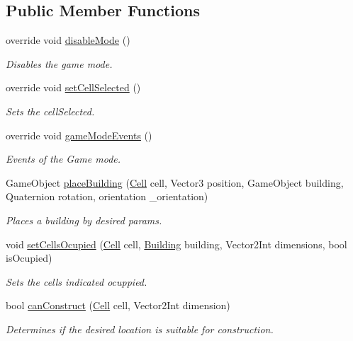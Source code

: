 \subsection*{Public Member Functions}
\begin{DoxyCompactItemize}
\item 
override void \mbox{\hyperlink{class_construction_mode_a4229d5bd9df34fd90758404acd3b9cc8}{disable\+Mode}} ()
\begin{DoxyCompactList}\small\item\em Disables the game mode. \end{DoxyCompactList}\item 
override void \mbox{\hyperlink{class_construction_mode_a4668815afe087d0cea35f8c7144e47f9}{set\+Cell\+Selected}} ()
\begin{DoxyCompactList}\small\item\em Sets the cell\+Selected. \end{DoxyCompactList}\item 
override void \mbox{\hyperlink{class_construction_mode_a58599c3aac705627c3b0fd034d54092a}{game\+Mode\+Events}} ()
\begin{DoxyCompactList}\small\item\em Events of the Game mode. \end{DoxyCompactList}\item 
Game\+Object \mbox{\hyperlink{class_construction_mode_abc41d867b12bfe26c28bea8ce773614d}{place\+Building}} (\mbox{\hyperlink{class_cell}{Cell}} cell, Vector3 position, Game\+Object building, Quaternion rotation, orientation \+\_\+orientation)
\begin{DoxyCompactList}\small\item\em Places a building by desired params. \end{DoxyCompactList}\item 
void \mbox{\hyperlink{class_construction_mode_acb76129315318237f90ea4dd25fb57b9}{set\+Cells\+Ocupied}} (\mbox{\hyperlink{class_cell}{Cell}} cell, \mbox{\hyperlink{class_building}{Building}} building, Vector2\+Int dimensions, bool is\+Ocupied)
\begin{DoxyCompactList}\small\item\em Sets the cells indicated ocuppied. \end{DoxyCompactList}\item 
bool \mbox{\hyperlink{class_construction_mode_aaf154f26d7cca5d1b8fd7a4d246616c6}{can\+Construct}} (\mbox{\hyperlink{class_cell}{Cell}} cell, Vector2\+Int dimension)
\begin{DoxyCompactList}\small\item\em Determines if the desired location is suitable for construction. \end{DoxyCompactList}\item 

\end{DoxyCompactItemize}
